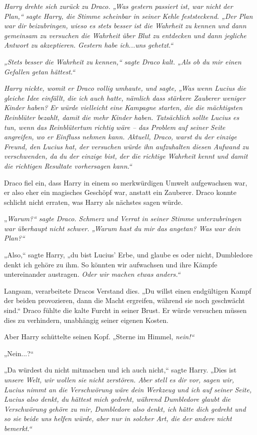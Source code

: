 {\emph{Harry drehte sich zurück zu Draco. „Was gestern passiert ist, war nicht der Plan,“ sagte Harry, die Stimme scheinbar in seiner Kehle feststeckend. „Der Plan war dir beizubringen, wieso es stets besser ist die Wahrheit zu kennen und dann gemeinsam zu versuchen die Wahrheit über Blut zu entdecken und dann jegliche Antwort zu akzeptieren. Gestern habe ich...uns gehetzt.“}

\emph{„Stets besser die Wahrheit zu kennen,“ sagte Draco kalt. „Als ob du mir einen Gefallen getan hättest.“}

\emph{Harry nickte, womit er Draco vollig umhaute, und sagte, „Was wenn Lucius die gleiche Idee einfällt, die ich auch hatte, nämlich dass stärkere Zauberer weniger Kinder haben? Er würde vielleicht eine Kampagne starten, die die mächtigsten Reinblüter bezahlt, damit die mehr Kinder haben. Tatsächlich sollte Lucius es tun, wenn das Reinblütertum richtig wäre -- das Problem auf seiner Seite angreifen, wo er Einfluss nehmen kann. Aktuell, Draco, warst du der einzige Freund, den Lucius hat, der versuchen würde ihn aufzuhalten diesen Aufwand zu verschwenden, da du der einzige bist, der die richtige Wahrheit kennt und damit die richtigen Resultate vorhersagen kann.“}

Draco fiel ein, dass Harry in einem so merkwürdigen Umwelt aufgewachsen war, er also eher ein magisches Geschöpf war, anstatt ein Zauberer. Draco konnte schlicht nicht erraten, was Harry als nächstes sagen würde.

„\emph{Warum?“ sagte Draco. Schmerz und Verrat in seiner Stimme unterzubringen war überhaupt nicht schwer. „Warum \emph{hast} du mir das angetan? Was \emph{war} dein Plan?“}

„Also,“ sagte Harry, „du bist Lucius' Erbe, und glaube es oder nicht, Dumbledore denkt ich gehöre zu ihm. So könnten wir aufwachsen und ihre Kämpfe untereinander austragen. \emph{Oder wir machen etwas anders.“}

Langsam, verarbeitete Dracos Verstand dies. „Du willst einen endgültigen Kampf der beiden provozieren, dann die Macht ergreifen, während sie noch geschwächt sind.“ Draco fühlte die kalte Furcht in seiner Brust. Er würde versuchen müssen dies zu verhindern, unabhängig seiner eigenen Kosten.

Aber Harry schüttelte seinen Kopf. „Sterne im Himmel, \emph{nein!“}

„Nein...?“

„Da würdest du nicht mitmachen und ich auch nicht,“ sagte Harry. „Dies ist \emph{unsere Welt, wir wollen sie nicht zerstören. Aber stell es dir vor, sagen wir, Lucius nimmt an die Verschwörung wäre dein Werkzeug und ich auf seiner Seite, Lucius also denkt, du hättest mich gedreht, während Dumbledore glaubt die Verschwörung gehöre zu mir, Dumbledore also denkt, ich hätte dich gedreht und so sie beide uns helfen würde, aber nur in solcher Art, die der andere nicht bemerkt.“}

}

